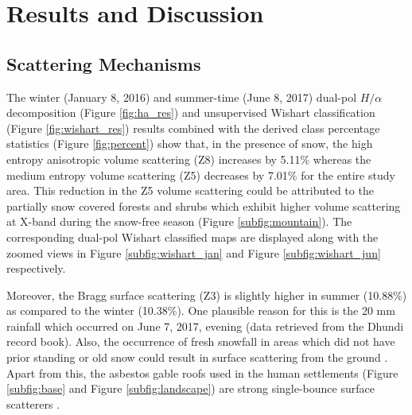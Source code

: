 \documentclass[12pt]{elsarticle}
\numberwithin{equation}{section}
\numberwithin{figure}{section}
\numberwithin{table}{section}
\begin{document}
\section{Results and Discussion}
\label{sec:res}
\subsection{Scattering Mechanisms}
\label{ssec:scat}

The winter (January 8, 2016) and summer-time (June 8, 2017) dual-pol $H/{\alpha}$ decomposition (Figure \ref{fig:ha_res}) and unsupervised Wishart classification (Figure \ref{fig:wishart_res}) results combined with the derived class percentage statistics (Figure \ref{fig:percent}) show that, in the presence of snow, the high entropy anisotropic volume scattering (Z8) increases by 5.11\% whereas the medium entropy volume scattering (Z5) decreases by 7.01\% for the entire study area. This reduction in the Z5 volume scattering could be attributed to the partially snow covered forests and shrubs which exhibit higher volume scattering at X-band during the snow-free season (Figure \ref{subfig:mountain}). The corresponding dual-pol Wishart classified maps are displayed along with the zoomed views in Figure \ref{subfig:wishart_jan} and Figure \ref{subfig:wishart_jun} respectively.

Moreover, the Bragg surface scattering (Z3) is slightly higher in summer (10.88\%) as compared to the winter (10.38\%). One plausible reason for this is the 20 mm rainfall which occurred on June 7, 2017, evening (data retrieved from the Dhundi record book). Also, the occurrence of fresh snowfall in areas which did not have prior standing or old snow could result in surface scattering from the ground \citep{Leinss2014}. Apart from this, the asbestos gable roofs used in the human settlements (Figure \ref{subfig:base} and Figure \ref{subfig:landscape}) are strong single-bounce surface scatterers \citep{Brunner2009}. 
\end{document}
